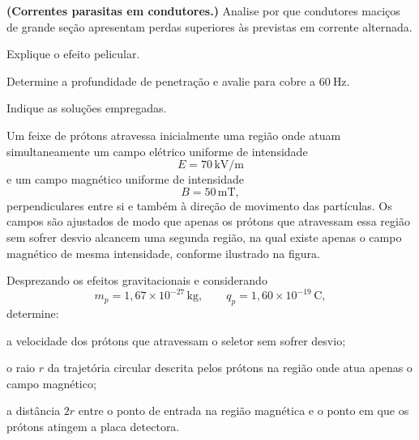 \begin{questao}[4]{}

\textbf{(Correntes parasitas em condutores.)} Analise por que condutores
maciços de grande seção apresentam perdas superiores às previstas em corrente
alternada.
\begin{itensq}
\item Explique o efeito pelicular.
\item Determine a profundidade de penetração e avalie para cobre a
      $\SI{60}{\hertz}$.
\item Indique as soluções empregadas.
\end{itensq}


\end{questao}
\begin{questao}[4]{}

 Um feixe de prótons atravessa inicialmente uma região onde atuam simultaneamente um campo elétrico uniforme de intensidade
\[
E = 70\,\mathrm{kV/m}
\]
e um campo magnético uniforme de intensidade
\[
B = 50\,\mathrm{mT},
\]
perpendiculares entre si e também à direção de movimento das partículas. Os campos são ajustados de modo que apenas os prótons que atravessam essa região sem sofrer desvio alcancem uma segunda região, na qual existe apenas o campo magnético de mesma intensidade, conforme ilustrado na figura.

Desprezando os efeitos gravitacionais e considerando
\[
m_p = 1{,}67\times10^{-27}\,\mathrm{kg},
\qquad
q_p = 1{,}60\times10^{-19}\,\mathrm{C},
\]
determine:

\begin{itensq}
    \item a velocidade dos prótons que atravessam o seletor sem sofrer desvio;
    \item o raio \(r\) da trajetória circular descrita pelos prótons na região onde atua apenas o campo magnético;
    \item a distância \(2r\) entre o ponto de entrada na região magnética e o ponto em que os prótons atingem a placa detectora.
\end{itensq}



\end{questao}
